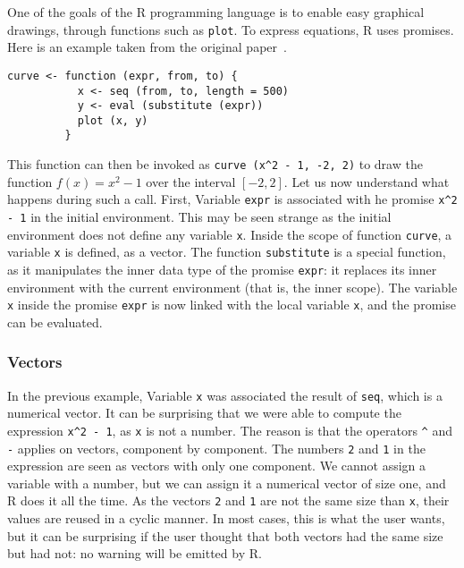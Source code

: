 \documentclass{article}
\newcommand\R{R}
\begin{document}
One of the goals of the \R{} programming language
is to enable easy graphical drawings,
through functions such as \texttt{plot}.
To express equations, \R{} uses promises.
Here is an example taken from the original paper~\parencite{ihaka1996r}.
\begin{verbatim}
curve <- function (expr, from, to) {
           x <- seq (from, to, length = 500)
           y <- eval (substitute (expr))
           plot (x, y)
         }
\end{verbatim}
This function can then be invoked as
\texttt{curve (x^2 - 1, -2, 2)}
to draw the function \(f(x) = x^2 - 1\)
over the interval \([-2, 2]\).
Let us now understand what happens during
such a call.
First, Variable \texttt{expr}
is associated with he promise \texttt{x^2 - 1}
in the initial environment.
This may be seen strange as the initial environment
does not define any variable \texttt{x}.
Inside the scope of function \texttt{curve},
a variable \texttt{x} is defined, as a vector.
The function \texttt{substitute} is a special function,
as it manipulates the inner data type of the promise \texttt{expr}:
it replaces its inner environment with the current environment
(that is, the inner scope).
The variable \texttt{x} inside the promise
\texttt{expr} is now linked with the local
variable \texttt{x},
and the promise can be evaluated.


\subsubsection{Vectors}

In the previous example,
Variable \texttt{x} was associated the result
of \texttt{seq}, which is a numerical vector.
It can be surprising that we were able to compute
the expression \texttt{x^2 - 1},
as \texttt{x} is not a number.
The reason is that the operators \texttt{^} and \texttt{-}
applies on vectors, component by component.
The numbers \texttt{2} and \texttt{1}
in the expression are seen as vectors with only one component.
We cannot assign a variable with a number,
but we can assign it a numerical vector of size one,
and \R{} does it all the time.
As the vectors \texttt{2} and \texttt{1}
are not the same size than \texttt{x},
their values are reused in a cyclic manner.
In most cases, this is what the user wants,
but it can be surprising if the user thought that both
vectors had the same size but had not:
no warning will be emitted by \R{}.
\end{document}
